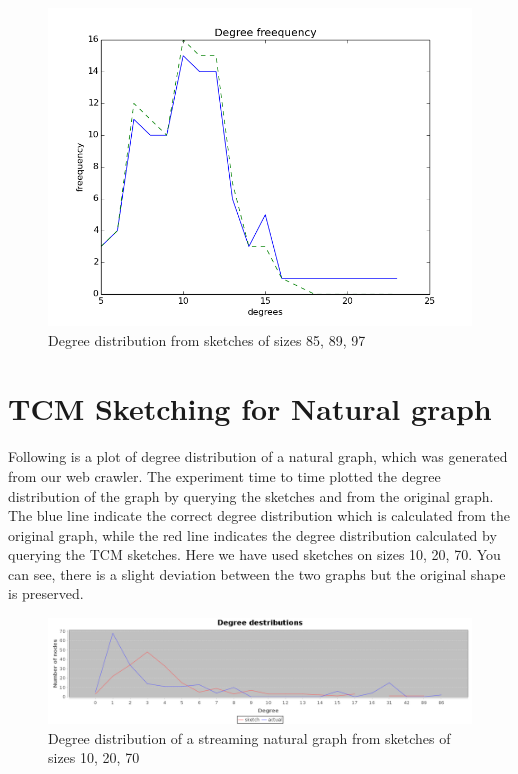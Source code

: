 \documentclass[12pt]{report}
\numberwithin{figure}{section}
\numberwithin{table}{section}
\begin{document}
\begin{figure}[H]
\centering
\includegraphics[scale=0.6]{images/dd3}
\caption{Degree distribution from sketches of sizes 85, 89, 97}
\end{figure}

\section{TCM Sketching for Natural graph}
Following is a plot of degree distribution of a natural graph, which was generated from our web crawler. The experiment time to time plotted the degree distribution of the graph by querying the sketches and from the original graph. The blue line indicate the correct degree distribution which is calculated from the original graph, while the red line indicates the degree distribution calculated by querying the TCM sketches. Here we have used sketches on sizes 10, 20, 70. You can see, there is a slight deviation between the two graphs but the original shape is preserved.

\begin{figure}[H]
\centering
\includegraphics[scale=0.3]{images/ddn}
\caption{Degree distribution of a streaming natural graph from sketches of sizes 10, 20, 70}
\end{figure}
\end{document}
